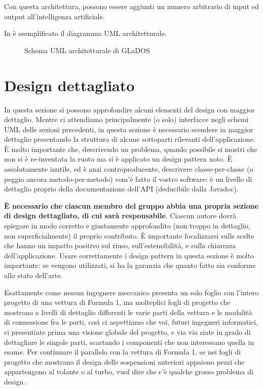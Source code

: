 \documentclass[a4paper,12pt]{report}
\begin{document}
Con questa architettura, possono essere aggiunti un numero arbitrario di input ed output all'intelligenza artificiale.

In  è esemplificato il diagramma UML architetturale.

\begin{figure}
\centering{}
\caption{Schema UML architetturale di GLaDOS}
\label{img:goodarch}
\end{figure}


\section{Design dettagliato}

In questa sezione si possono approfondire alcuni elementi del design con maggior dettaglio.
%
Mentre ci attendiamo principalmente (o solo) interfacce negli schemi UML delle sezioni precedenti, in questa sezione è necessario scendere in maggior dettaglio presentando la struttura di alcune sottoparti rilevanti dell'applicazione.
%
È molto importante che, descrivendo un problema, quando possibile si mostri che non si è re-inventata la ruota ma si è applicato un design pattern noto.
%
È assolutamente inutile, ed è anzi controproducente, descrivere classe-per-classe (o peggio ancora metodo-per-metodo) com'è fatto il vostro software: è un livello di dettaglio proprio della documentazione dell'API (deducibile dalla Javadoc).

\textbf{È necessario che ciascun membro del gruppo abbia una propria sezione di design dettagliato, di cui sarà responsabile}.
%
Ciascun autore dovrà spiegare in modo corretto e giustamente approfondito (non troppo in dettaglio, non superficialmente) il proprio contributo.
%
È importante focalizzarsi sulle scelte che hanno un impatto positivo sul riuso, sull'estensibilità, e sulla chiarezza dell'applicazione.
%
Usare correttamente i design pattern in questa sezione è molto importante: se vengono utilizzati, si ha la garanzia che quanto fatto sia conforme allo stato dell'arte.

Esattamente come nessun ingegnere meccanico presenta un solo foglio con l'intero progetto di una vettura di Formula 1, ma molteplici fogli di progetto che mostrano a livelli di dettaglio differenti le varie parti della vettura e le modalità di connessione fra le parti, così ci aspettiamo che voi, futuri ingegneri informatici, ci presentiate prima una visione globale del progetto, e via via siate in grado di dettagliare le singole parti, scartando i componenti che non interessano quella in esame.
%
Per continuare il parallelo con la vettura di Formula 1, se nei fogli di progetto che mostrano il design delle sospensioni anteriori appaiono pezzi che appartengono al volante o al turbo, vuol dire che c'è qualche grosso problema di design.
\end{document}

